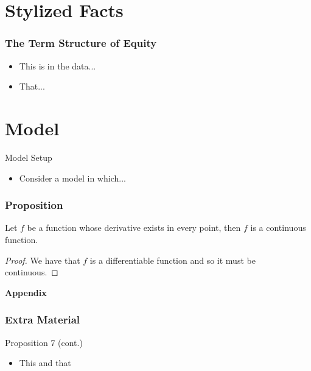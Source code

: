 \documentclass[ignorenonframetext, 9pt]{beamer}
\begin{document}
\section{Stylized Facts}


\begin{frame}
  \frametitle{The Term Structure of Equity}
  \begin{itemize}
  \item This is in the data...
  \item That...
  \end{itemize}
\label{slide:stylized_facts}
\end{frame}

\section{Model}


\begin{frame}{Model Setup}
\begin{itemize}
\item Consider a model in which...
\end{itemize}
\label{slide:state-space-framework}
\hyperlink{slide:stylized_facts}{}
\end{frame}

\begin{frame}
\centering
{}
\end{frame}


\begin{frame}
  \frametitle{Proposition}

  \begin{proposition}
    Let \(f\) be a function whose derivative exists in every point, then \(f\) is 
    a continuous function.
  \end{proposition}
  \begin{proof}
    We have that \(f\) is a differentiable function and so it must be continuous.
  \end{proof}
  

\end{frame}

\appendix
\begin{frame}
  \centering
  \textbf{Appendix}
\end{frame}

\begin{frame}
  \frametitle{Extra Material}
  \label{slide:prop7}
\alert{Proposition 7 (cont.)}
\begin{itemize}
\item This and that
\end{itemize}
\end{frame}


%   
\end{document}
